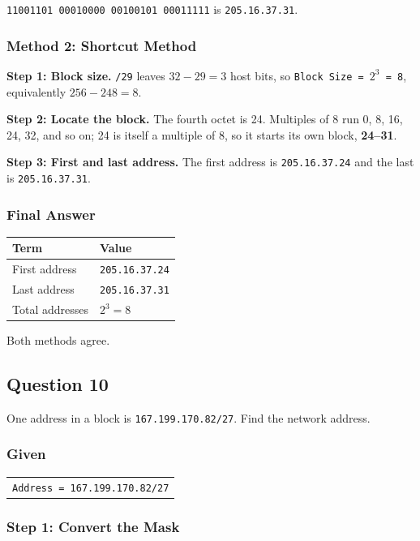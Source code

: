 \documentclass[11pt,a4paper]{article}
\begin{document}
\texttt{11001101 00010000 00100101 00011111} is \texttt{205.16.37.31}.

\subsubsection*{Method 2: Shortcut Method}

\textbf{Step 1: Block size.} \texttt{/29} leaves $32 - 29 = 3$ host bits, so
\texttt{Block Size = $2^{3}$ = 8}, equivalently $256 - 248 = 8$.

\textbf{Step 2: Locate the block.} The fourth octet is 24. Multiples of 8 run 0,
8, 16, 24, 32, and so on; 24 is itself a multiple of 8, so it starts its own
block, \textbf{24--31}.

\textbf{Step 3: First and last address.} The first address is
\texttt{205.16.37.24} and the last is \texttt{205.16.37.31}.

\subsubsection*{Final Answer}

\begin{tabularx}{\textwidth}{@{}lX@{}}
\toprule
\rowcolor{tablehead}\textbf{Term} & \textbf{Value} \\
\midrule
First address & \texttt{205.16.37.24} \\
Last address & \texttt{205.16.37.31} \\
Total addresses & $2^{3} = 8$ \\
\bottomrule
\end{tabularx}

Both methods agree.

\subsection*{Question 10}

One address in a block is \texttt{167.199.170.82/27}. Find the network address.

\subsubsection*{Given}

\begin{tabularx}{\textwidth}{@{}X@{}}
\texttt{Address = 167.199.170.82/27} \\
\end{tabularx}

\subsubsection*{Step 1: Convert the Mask}
\end{document}
